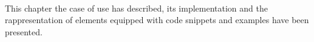 \paragraph{}
This chapter the case of use has described, its implementation and the rappresentation of elements equipped with code snippets and examples have been presented.